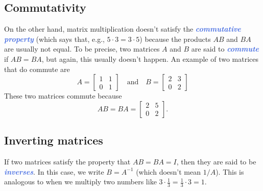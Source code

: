 \documentclass[10pt]{article}
\newcommand{\demph}[1]{\textcolor{RoyalBlue}{\textbf{\slshape #1}}} %
\theoremstyle{definition}
\begin{document}
\subsection{Commutativity}
On the other hand, matrix multiplication doesn't satisfy the
\demph{commutative property} (which says that, e.g., $5\cdot 3 = 3\cdot 5$)
because the products $AB$ and $BA$ are usually not equal. To be precise, two
matrices $A$ and $B$ are said to \demph{commute} if $AB=BA$, but again, this
usually doesn't happen. An example of two matrices that do commute are
\begin{equation*}
  A =
  \begin{bmatrix}
    1&1\\
    0&1
  \end{bmatrix}
  \quad \text{and} \quad
  B =
  \begin{bmatrix}
    2&3\\
    0&2
  \end{bmatrix}
\end{equation*}
These two matrices commute because
\begin{equation*}
  AB=BA =
  \begin{bmatrix}
    2&5\\
    0&2
  \end{bmatrix}.
\end{equation*}

\subsection{Inverting matrices}

If two matrices satisfy the property that $AB=BA=I$, then they are said to
be \demph{inverses}. In this case, we write $B=A^{-1}$ (which doesn't
mean $1/A$). This is analogous to when we multiply two numbers like
$3\cdot \frac{1}{3}= \frac{1}{3}\cdot 3=1$.
\end{document}
